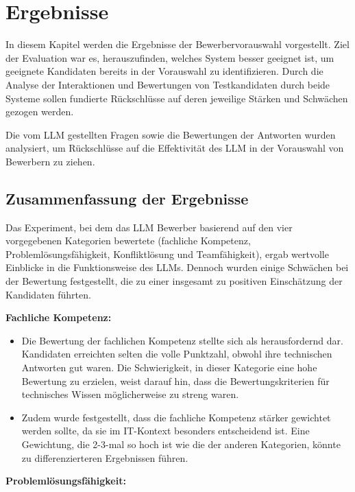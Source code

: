 
\chapter{Ergebnisse}

In diesem Kapitel werden die Ergebnisse der Bewerbervorauswahl vorgestellt. Ziel der Evaluation war es, herauszufinden, welches System besser geeignet ist, um geeignete Kandidaten bereits in der Vorauswahl zu identifizieren. Durch die Analyse der Interaktionen und Bewertungen von Testkandidaten durch beide Systeme sollen fundierte Rückschlüsse auf deren jeweilige Stärken und Schwächen gezogen werden.

Die vom \acs{LLM} gestellten Fragen sowie die Bewertungen der Antworten wurden analysiert, um Rückschlüsse auf die Effektivität des \acs{LLM} in der Vorauswahl von Bewerbern zu ziehen.

\section{Zusammenfassung der Ergebnisse}

Das Experiment, bei dem das \acs{LLM} Bewerber basierend auf den vier vorgegebenen Kategorien bewertete (fachliche Kompetenz, Problemlösungsfähigkeit, Konfliktlösung und Teamfähigkeit), ergab wertvolle Einblicke in die Funktionsweise des \acs{LLM}s. Dennoch wurden einige Schwächen bei der Bewertung festgestellt, die zu einer insgesamt zu positiven Einschätzung der Kandidaten führten.

\textbf{Fachliche Kompetenz:}

\begin{itemize}
    \item Die Bewertung der fachlichen Kompetenz stellte sich als herausfordernd dar. Kandidaten erreichten selten die volle Punktzahl, obwohl ihre technischen Antworten gut waren. Die Schwierigkeit, in dieser Kategorie eine hohe Bewertung zu erzielen, weist darauf hin, dass die Bewertungskriterien für technisches Wissen möglicherweise zu streng waren.
    \item Zudem wurde festgestellt, dass die fachliche Kompetenz stärker gewichtet werden sollte, da sie im IT-Kontext besonders entscheidend ist. Eine Gewichtung, die 2-3-mal so hoch ist wie die der anderen Kategorien, könnte zu differenzierteren Ergebnissen führen.
\end{itemize}

\textbf{Problemlösungsfähigkeit:}

